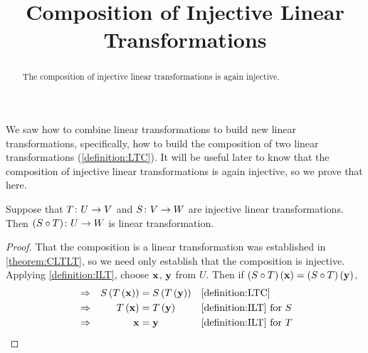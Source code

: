 \documentclass{ximera}
\title{Composition of Injective Linear Transformations}
\begin{document}
\begin{abstract}
  The composition of injective linear transformations is again injective.
\end{abstract}
\maketitle

We saw how to combine linear transformations to build new linear
transformations, specifically, how to build the composition of two
linear transformations (\ref{definition:LTC}).  It will be useful
later to know that the composition of injective linear transformations
is again injective, so we prove that here.


\begin{theorem}
\label{theorem:CILTI}


Suppose that $T\colon U\rightarrow V$ and $S\colon V\rightarrow W$ are injective linear transformations.  Then $({S}\circ{T})\colon U\rightarrow W$ is  linear transformation.


\begin{proof}
That the composition is a linear transformation was established in \ref{theorem:CLTLT}, so we need only establish that the composition is injective.  Applying \ref{definition:ILT}, choose $\mathbf{x}$, $\mathbf{y}$ from $U$.  Then if $\left({S}\circ{T}\right)\left(\mathbf{x}\right)=\left({S}\circ{T}\right)\left(\mathbf{y}\right)$,
\begin{align*}
&\Rightarrow&S\left(T\left(\mathbf{x}\right)\right)&=S\left(T\left(\mathbf{y}\right)\right)
&&\ref{definition:LTC}\\
&\Rightarrow&T\left(\mathbf{x}\right)&=T\left(\mathbf{y}\right)
&&\ref{definition:ILT}\text{ for }S\\
&\Rightarrow&\mathbf{x}&=\mathbf{y}
&&\ref{definition:ILT}\text{ for }T
\end{align*}




\end{proof}
\end{theorem}
\end{document}
